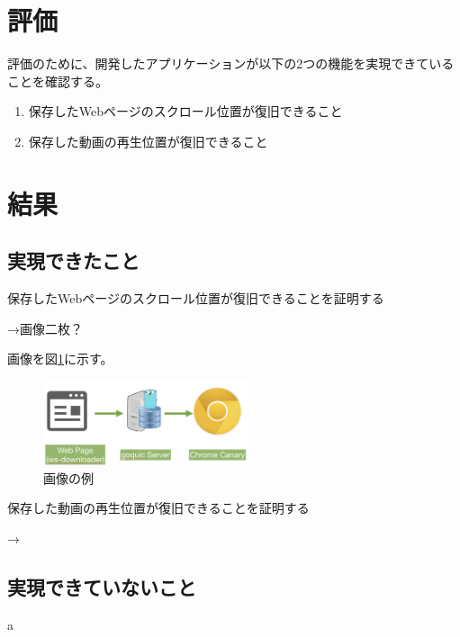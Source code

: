 \documentclass[a4j,10pt]{jsarticle}
\begin{document}
\section{評価}
評価のために、開発したアプリケーションが以下の2つの機能を実現できていることを確認する。
\begin{enumerate}
\item 保存したWebページのスクロール位置が復旧できること
\item 保存した動画の再生位置が復旧できること
\end{enumerate}

\section{結果}
\subsection{実現できたこと}
保存したWebページのスクロール位置が復旧できることを証明する

→画像二枚？

画像を図\ref{sample}に示す。

\begin{figure}[htbp]
    \begin{center}
        \includegraphics[width=6cm]{figure1.png}
        \caption{画像の例}
        \label{sample}
    \end{center}
\end{figure}


保存した動画の再生位置が復旧できることを証明する

→

\subsection{実現できていないこと}
a



\end{document}
